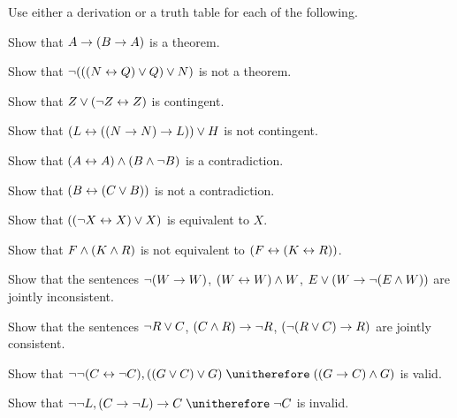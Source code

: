 \noindent\problempart Use either a derivation or a truth table for each of the following.
\begin{compactlist}%
\item Show that $A \rightarrow (B \rightarrow A)$ is a theorem.
\item Show that $\neg (((N \leftrightarrow Q) \vee Q) \vee N)$ is not a theorem.
\item Show that $ Z \vee (\neg Z \leftrightarrow Z) $ is contingent.
\item Show that $ (L \leftrightarrow ((N \rightarrow N) \rightarrow L)) \vee H $ is not contingent.
\item Show that $ (A \leftrightarrow A) \wedge (B \wedge \neg B)$ is a contradiction.
\item Show that $ (B \leftrightarrow (C \vee B)) $ is not a contradiction.
\item Show that $ ((\neg X \leftrightarrow X) \vee X) $ is equivalent to $X$.
\item Show that $F \wedge (K \wedge R) $ is not equivalent to $ (F \leftrightarrow (K \leftrightarrow R)) $.
\item Show that the sentences $ \neg (W \rightarrow W)$, $(W \leftrightarrow W) \wedge W$, $E \vee (W \rightarrow \neg (E \wedge W))$ are jointly inconsistent.
\item Show that the sentences  $\neg R \vee C $, $(C \wedge R) \rightarrow \neg R$, $(\neg (R \vee C) \rightarrow R) $ are jointly consistent.
\item Show that $\enot \enot (C \eiff \enot C), ((G \eor C) \eor G) \therefore ((G \eif C) \eand G) $ is valid.
\item Show that $ \enot \enot L,  (C \eif \enot L) \eif C \therefore \enot C$ is invalid.
\end{compactlist}

